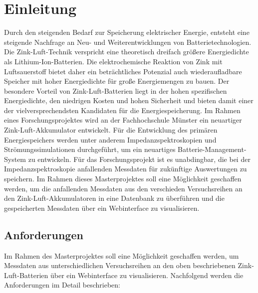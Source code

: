 \chapter{Einleitung}\label{ch:einleitung}


Durch den steigenden Bedarf zur Speicherung elektrischer Energie, entsteht eine steigende Nachfrage an Neu- und Weiterentwicklungen von Batterietechnologien. Die Zink-Luft-Technik verspricht eine theoretisch dreifach größere Energiedichte als Lithium-Ion-Batterien. Die elektrochemische Reaktion von Zink mit Luftsauerstoff bietet daher ein beträchtliches Potenzial auch wiederaufladbare Speicher mit hoher Energiedichte für große Energiemengen zu bauen. Der besondere Vorteil von Zink-Luft-Batterien liegt in der hohen spezifischen Energiedichte, den niedrigen Kosten und hohen Sicherheit und bieten damit einer der vielversprechendsten Kandidaten für die Energiespeicherung. Im Rahmen eines Forschungsprojektes wird an der Fachhochschule Münster ein neuartiger Zink-Luft-Akkumulator entwickelt. Für die Entwicklung des primären Energiespeichers werden unter anderem Impedanzspektroskopien und Strömungssimulationen durchgeführt, um ein neuartiges Batterie-Management-System zu entwickeln. Für das Forschungsprojekt ist es unabdingbar, die bei der Impedanzspektroskopie anfallenden Messdaten für zukünftige Auswertungen zu speichern. Im Rahmen dieses Masterprojektes soll eine Möglichkeit geschaffen werden, um die anfallenden Messdaten aus den verschieden Versuchsreihen an den Zink-Luft-Akkumulatoren in eine Datenbank zu überführen und die gespeicherten Messdaten über ein Webinterface zu visualisieren.

\newpage


\section{Anforderungen}

Im Rahmen des Masterprojektes soll eine Möglichkeit geschaffen werden, um Messdaten aus unterschiedlichen Versuchsreihen an den oben beschriebenen Zink-Luft-Batterien über ein Webinterface zu visualisieren. Nachfolgend werden die Anforderungen im Detail beschrieben:

